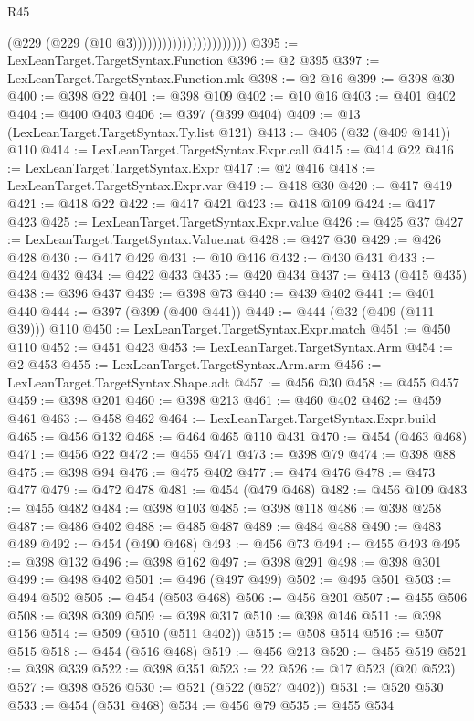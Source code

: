 \begin{lexlean}{R45}
\begin{coremodule}
{{{{{{{{{{{{{{{{{{{{{{{{{{{{{{{{{{{{{{{{{{{{{{{{{{{{{{{{{{{{{{{{{{{{{{{{{{{{{{{{{{{{{{{{{{{                                            (@229 (@229 (@10 @3)))))))))))))))))))))))
@395 := LexLeanTarget.TargetSyntax.Function
@396 := @2 @395
@397 := LexLeanTarget.TargetSyntax.Function.mk
@398 := @2 @16
@399 := @398 @30
@400 := @398 @22
@401 := @398 @109
@402 := @10 @16
@403 := @401 @402
@404 := @400 @403
@406 := @397 (@399 @404)
@409 := @13 (LexLeanTarget.TargetSyntax.Ty.list @121)
@413 := @406 (@32 (@409 @141)) @110
@414 := LexLeanTarget.TargetSyntax.Expr.call
@415 := @414 @22
@416 := LexLeanTarget.TargetSyntax.Expr
@417 := @2 @416
@418 := LexLeanTarget.TargetSyntax.Expr.var
@419 := @418 @30
@420 := @417 @419
@421 := @418 @22
@422 := @417 @421
@423 := @418 @109
@424 := @417 @423
@425 := LexLeanTarget.TargetSyntax.Expr.value
@426 := @425 @37
@427 := LexLeanTarget.TargetSyntax.Value.nat
@428 := @427 @30
@429 := @426 @428
@430 := @417 @429
@431 := @10 @416
@432 := @430 @431
@433 := @424 @432
@434 := @422 @433
@435 := @420 @434
@437 := @413 (@415 @435)
@438 := @396 @437
@439 := @398 @73
@440 := @439 @402
@441 := @401 @440
@444 := @397 (@399 (@400 @441))
@449 := @444 (@32 (@409 (@111 @39))) @110
@450 := LexLeanTarget.TargetSyntax.Expr.match
@451 := @450 @110
@452 := @451 @423
@453 := LexLeanTarget.TargetSyntax.Arm
@454 := @2 @453
@455 := LexLeanTarget.TargetSyntax.Arm.arm
@456 := LexLeanTarget.TargetSyntax.Shape.adt
@457 := @456 @30
@458 := @455 @457
@459 := @398 @201
@460 := @398 @213
@461 := @460 @402
@462 := @459 @461
@463 := @458 @462
@464 := LexLeanTarget.TargetSyntax.Expr.build
@465 := @456 @132
@468 := @464 @465 @110 @431
@470 := @454 (@463 @468)
@471 := @456 @22
@472 := @455 @471
@473 := @398 @79
@474 := @398 @88
@475 := @398 @94
@476 := @475 @402
@477 := @474 @476
@478 := @473 @477
@479 := @472 @478
@481 := @454 (@479 @468)
@482 := @456 @109
@483 := @455 @482
@484 := @398 @103
@485 := @398 @118
@486 := @398 @258
@487 := @486 @402
@488 := @485 @487
@489 := @484 @488
@490 := @483 @489
@492 := @454 (@490 @468)
@493 := @456 @73
@494 := @455 @493
@495 := @398 @132
@496 := @398 @162
@497 := @398 @291
@498 := @398 @301
@499 := @498 @402
@501 := @496 (@497 @499)
@502 := @495 @501
@503 := @494 @502
@505 := @454 (@503 @468)
@506 := @456 @201
@507 := @455 @506
@508 := @398 @309
@509 := @398 @317
@510 := @398 @146
@511 := @398 @156
@514 := @509 (@510 (@511 @402))
@515 := @508 @514
@516 := @507 @515
@518 := @454 (@516 @468)
@519 := @456 @213
@520 := @455 @519
@521 := @398 @339
@522 := @398 @351
@523 := 22
@526 := @17 @523 (@20 @523)
@527 := @398 @526
@530 := @521 (@522 (@527 @402))
@531 := @520 @530
@533 := @454 (@531 @468)
@534 := @456 @79
@535 := @455 @534
}}}}}}}}}}}}}}}}}}}}}}}}}}}}}}}}}}}}}}}}}}}}}}}}}}}}}}}}}}}}}}}}}}}}}}}}}}}}}}}}}}}}}}}}}}}
\end{coremodule}
\end{lexlean}
